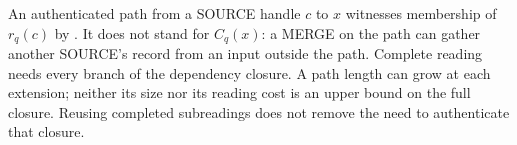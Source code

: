 \documentclass[../main.tex]{subfiles}
\begin{document}
\begin{remark}
\label{rem:kpcfixed-interface:dependency-closure}
An authenticated path from a SOURCE handle $c$ to $x$ witnesses membership
of $r_q(c)$ by . It does not
stand for $C_q(x)$: a MERGE on the path can gather another SOURCE's record
from an input outside the path. Complete reading needs every branch of
the dependency closure. A path length can grow at each extension; neither
its size nor its reading cost is an upper bound on the full closure. Reusing
completed subreadings does not remove the need to authenticate that closure.
\end{remark}
\end{document}

